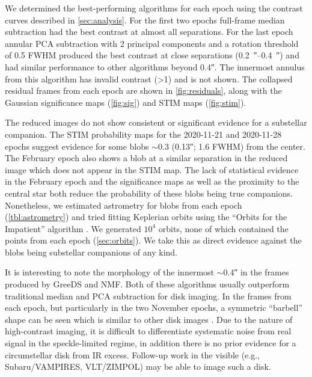 \documentclass[twocolumn]{aastex631}
\begin{document}
We determined the best-performing algorithms for each epoch using the contrast curves described in \cref{sec:analysis}. For the first two epochs full-frame median subtraction had the best contrast at almost all separations. For the last epoch annular PCA subtraction with 2 principal components and a rotation threshold of 0.5 FWHM produced the best contrast at close separations (\qtyrange{0.2}{0.4}{\arcsecond}) and had similar performance to other algorithms beyond \ang{;;0.4}. The innermost annulus from this algorithm has invalid contrast (\textgreater1) and is not shown. The collapsed residual frames from each epoch are shown in \cref{fig:residuals}, along with the Gaussian significance maps (\cref{fig:sig}) and STIM maps (\cref{fig:stim}).

The reduced images do not show consistent or significant evidence for a substellar companion. The STIM probability maps for the 2020-11-21 and 2020-11-28 epochs suggest evidence for some blobs $\sim$\qty{0.3}{\au} (\ang{;;0.13}; 1.6 FWHM) from the center. The February epoch also shows a blob at a similar separation in the reduced image which does not appear in the STIM map. The lack of statistical evidence in the February epoch and the significance maps as well as the proximity to the central star both reduce the probability of these blobs being true companions. Nonetheless, we estimated astrometry for blobs from each epoch (\cref{tbl:astrometry}) and tried fitting Keplerian orbits using the ``Orbits for the Impatient'' algorithm \citep[OFTI;][]{blunt_orbits_2017}. We generated $10^4$ orbits, none of which contained the points from each epoch (\cref{sec:orbits}). We take this as direct evidence against the blobs being substellar companions of any kind.

It is interesting to note the morphology of the innermost $\sim$\ang{;;0.4} in the frames produced by GreeDS and NMF. Both of these algorithms usually outperform traditional median and PCA subtraction for disk imaging. In the frames from each epoch, but particularly in the two November epochs, a symmetric ``barbell'' shape can be seen which is similar to other disk images \citep[e.g., fig.~7][]{norris_vampires_2014}. Due to the nature of high-contrast imaging, it is difficult to differentiate systematic noise from real signal in the speckle-limited regime, in addition there is no prior evidence for a circumstellar disk from IR excess. Follow-up work in the visible (e.g., Subaru/VAMPIRES, VLT/ZIMPOL) may be able to image such a disk.
\end{document}
